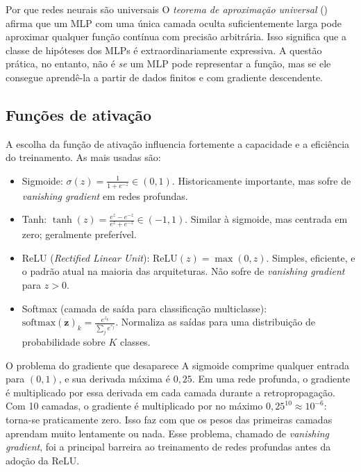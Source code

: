 \documentclass[12pt,a4paper]{article}
\begin{document}
\begin{notabox}{Por que redes neurais são universais}
O \emph{teorema de aproximação universal} (\citep{hornik1991approximation,cybenko1989approximation}) afirma que um MLP com uma única camada oculta suficientemente larga pode aproximar qualquer função contínua com precisão arbitrária. Isso significa que a classe de hipóteses dos MLPs é extraordinariamente expressiva. A questão prática, no entanto, não é \emph{se} um MLP pode representar a função, mas se ele consegue aprendê-la a partir de dados finitos e com gradiente descendente.
\end{notabox}

\subsection{Funções de ativação}
\label{subsec:ativacao}

A escolha da função de ativação influencia fortemente a capacidade e a eficiência do treinamento. As mais usadas são:

\begin{itemize}
    \item Sigmoide: $\sigma(z) = \frac{1}{1+e^{-z}} \in (0,1)$. Historicamente importante, mas sofre de \textit{vanishing gradient} em redes profundas.
    \item Tanh: $\tanh(z) = \frac{e^z - e^{-z}}{e^z + e^{-z}} \in (-1,1)$. Similar à sigmoide, mas centrada em zero; geralmente preferível.
    \item ReLU (\textit{Rectified Linear Unit}): $\text{ReLU}(z) = \max(0, z)$. Simples, eficiente, e o padrão atual na maioria das arquiteturas. Não sofre de \textit{vanishing gradient} para $z > 0$.
    \item Softmax (camada de saída para classificação multiclasse): $\text{softmax}(\mathbf{z})_k = \frac{e^{z_k}}{\sum_j e^{z_j}}$. Normaliza as saídas para uma distribuição de probabilidade sobre $K$ classes.
\end{itemize}

\begin{alertabox}{O problema do gradiente que desaparece}
A sigmoide comprime qualquer entrada para $(0,1)$, e sua derivada máxima é $0{,}25$. Em uma rede profunda, o gradiente é multiplicado por essa derivada em cada camada durante a retropropagação. Com 10 camadas, o gradiente é multiplicado por no máximo $0{,}25^{10} \approx 10^{-6}$: torna-se praticamente zero. Isso faz com que os pesos das primeiras camadas aprendam muito lentamente ou nada. Esse problema, chamado de \emph{vanishing gradient}, foi a principal barreira ao treinamento de redes profundas antes da adoção da ReLU.
\end{alertabox}
\end{document}
